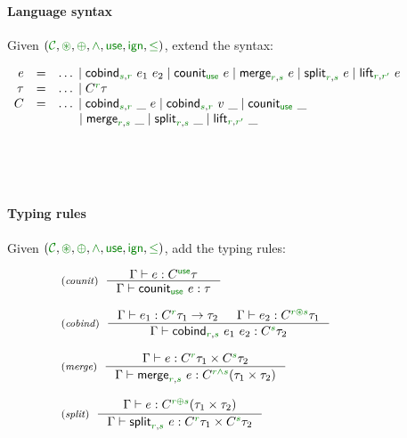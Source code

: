 
\begin{figure}[t]
\paragraph{Language syntax}
Given $(\C, \cseq, \cpar, \czip, \cunit, \czero, \cleq)$, extend the syntax:

\begin{equation*}
\begin{array}{rcl}
  e &  =  &\ldots \sep\ident{cobind}_{\cclrd{s},\cclrd{r}}~e_1~e_2 \sep \ident{counit}_{\cunit}~e \sep \ident{merge}_{\cclrd{r},\cclrd{s}}~e 
         \sep \ident{split}_{\cclrd{r},\cclrd{s}}~e \sep \ident{lift}_{\cclrd{r},\cclrd{r'}}~e \\
  \tau &  = &\ldots \sep \ctyp{\cclrd{r}}{\tau} \\
  C  & = &\ldots \sep \ident{cobind}_{\cclrd{s},\cclrd{r}}~\_~e \sep \ident{cobind}_{\cclrd{s},\cclrd{r}}~v~\_ \sep \ident{counit}_{\cunit}~\_ \\
    && \hspace{1.4em} \sep \ident{merge}_{\cclrd{r},\cclrd{s}}~\_
           \sep \ident{split}_{\cclrd{r},\cclrd{s}}~\_ \sep \ident{lift}_{\cclrd{r},\cclrd{r'}}~\_ \\  
\end{array}
\end{equation*}

~

~

\paragraph{Typing rules}
Given $(\C, \cseq, \cpar, \czip, \cunit, \czero, \cleq)$, add the typing rules:

\begin{equation*}
\begin{array}{l}
\tyrule{counit}
  {\Gamma \vdash e : \ctyp{\cunit}{\tau}}
  {\Gamma \vdash \ident{counit}_{\cunit}~e : \tau} \\
\\
\tyrule{cobind}
  {\Gamma \vdash e_1 : \ctyp{\cclrd{r}}{\tau_1} \rightarrow \tau_2 & \Gamma \vdash e_2 : \ctyp{\cclrd{r}\cseq\cclrd{s}}{\tau_1} }
  {\Gamma \vdash \ident{cobind}_{\cclrd{r}, \cclrd{s}}~e_1~e_2 : \ctyp{\cclrd{s}}{\tau_2}} \\
  \\
\tyrule{merge}
  {\Gamma \vdash  e : \ctyp{\cclrd{r}}{\tau_1} \times \ctyp{\cclrd{s}}{\tau_2} } 
  {\Gamma \vdash  \ident{merge}_{\cclrd{r},\cclrd{s}}~e : \ctyp{\cclrd{r}\czip\cclrd{s}}{(\tau_1 \times \tau_2)} }\\
    \\
\tyrule{split}
  {\Gamma \vdash  e : \ctyp{\cclrd{r}\cpar\cclrd{s}}{(\tau_1 \times \tau_2)} }
  {\Gamma \vdash  \ident{split}_{\cclrd{r},\cclrd{s}}~e : \ctyp{\cclrd{r}}{\tau_1} \times \ctyp{\cclrd{s}}{\tau_2}} \\
\end{array}
\end{equation*}


\end{figure}
